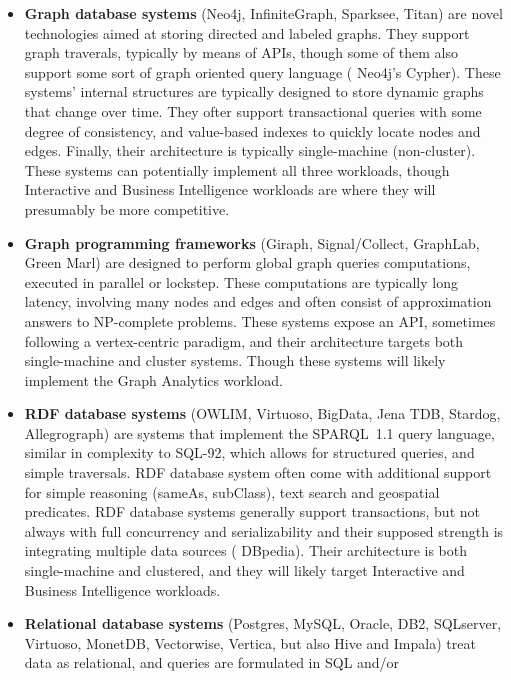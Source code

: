 \begin{itemize}
 \item \textbf{Graph database systems} (\eg Neo4j, InfiniteGraph, Sparksee,
     Titan) are novel technologies aimed at storing directed and labeled
     graphs. They support graph traverals, typically by means of APIs, though
     some of them also support some sort of graph oriented query language (\eg
     Neo4j's Cypher). These systems' internal structures are typically designed
     to store dynamic graphs that change over time.  They ofter support
     transactional queries with some degree of consistency, and value-based
     indexes to quickly locate nodes and edges. Finally, their architecture is
     typically single-machine (non-cluster). These systems can
     potentially implement all three workloads, though Interactive and Business Intelligence
     workloads are where they will presumably be more competitive.
 \item \textbf{Graph programming frameworks} (\eg Giraph, Signal/Collect,
     GraphLab, Green Marl) are designed to perform global graph queries
     computations, executed in parallel or lockstep. These computations are typically
     long latency, involving many nodes and edges and often consist of approximation
     answers to NP-complete problems. These systems expose an API, sometimes following
     a vertex-centric paradigm, and their architecture targets both single-machine and
     cluster systems. Though these systems will likely implement the Graph Analytics workload.
 \item \textbf{RDF database systems} (\eg OWLIM, Virtuoso, BigData, Jena TDB,
     Stardog, Allegrograph) are systems that implement the SPARQL~1.1 query
     language, similar in complexity to \mbox{SQL-92}, which allows for structured
     queries, and simple traversals. RDF database system often come with
     additional support for simple reasoning (sameAs, subClass), text search and
     geospatial predicates.  RDF database systems generally support
     transactions, but not always with full concurrency and serializability and
     their supposed strength is integrating multiple data sources (\eg
     DBpedia). Their architecture is both single-machine and clustered, and
     they will likely target Interactive and Business Intelligence workloads.
 \item \textbf{Relational database systems} (\eg Postgres, MySQL, Oracle, DB2,
     SQLserver, Virtuoso, MonetDB, Vectorwise, Vertica, but also Hive and
     Impala) treat data as relational, and queries are formulated in SQL and/or

\end{itemize}
